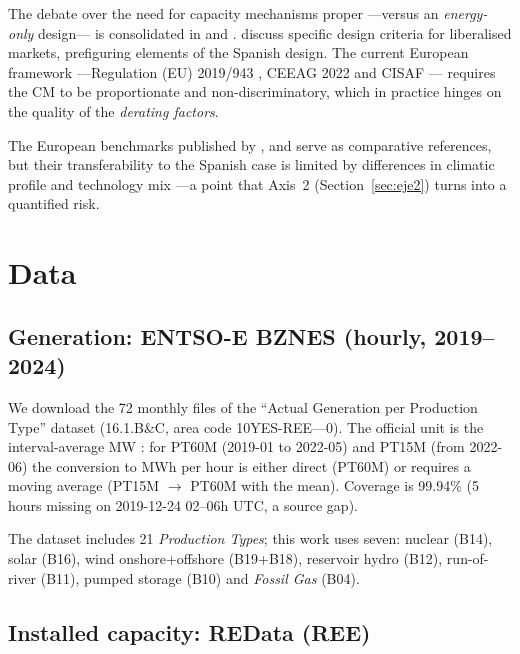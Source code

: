 \documentclass[11pt,a4paper]{article}
\begin{document}
The debate over the need for capacity mechanisms proper ---versus an
\emph{energy-only} design--- is consolidated in \citet{joskow2008} and
\citet{cramton2013}. \citet{batlleperezarriaga2008} discuss specific design
criteria for liberalised markets, prefiguring elements of the Spanish design. The current
European framework ---Regulation (EU) 2019/943 \citep{euelectricityreg}, CEEAG 2022
\citep{ceeag2022} and CISAF \citep{cisaf2025}--- requires the CM to be
proportionate and non-discriminatory, which in practice hinges on the quality of
the \emph{derating factors}.

The European benchmarks published by \citet{nationalgrideso2024},
\citet{eirgrid2023} and \citet{pse2023} serve as comparative references, but their
transferability to the Spanish case is limited by differences in climatic profile
and technology mix ---a point that Axis~2 (Section~\ref{sec:eje2}) turns into a
quantified risk.

\section{Data}

\subsection{Generation: ENTSO-E BZN\textbar ES (hourly, 2019--2024)}

We download the 72 monthly files of the ``Actual Generation per Production Type''
dataset (16.1.B\&C, area code 10YES-REE---0). The official unit is the
interval-average MW \citep{entsoe2023}: for PT60M (2019-01 to 2022-05) and PT15M
(from 2022-06) the conversion to MWh per hour is either direct (PT60M) or requires
a moving average (PT15M $\rightarrow$ PT60M with the mean). Coverage is 99.94\%
(5 hours missing on 2019-12-24 02--06h UTC, a source gap).

The dataset includes 21 \emph{Production Types}; this work uses seven: nuclear
(B14), solar (B16), wind onshore+offshore (B19+B18), reservoir hydro (B12),
run-of-river (B11), pumped storage (B10) and \emph{Fossil Gas} (B04).

\subsection{Installed capacity: REData (REE)}
\end{document}
